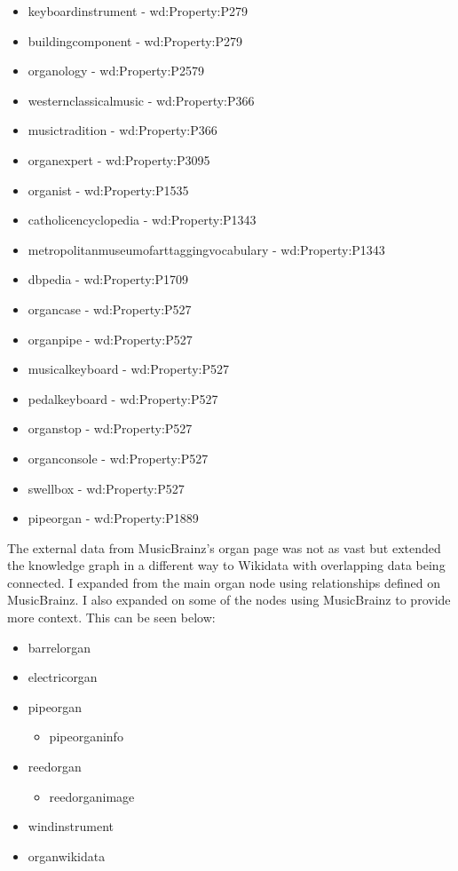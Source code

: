\begin{itemize}
    \itemsep0em 
    \item keyboardinstrument - wd:Property:P279
    \item buildingcomponent - wd:Property:P279
    \item organology - wd:Property:P2579 
    \item westernclassicalmusic - wd:Property:P366
    \item musictradition - wd:Property:P366
    \item organexpert - wd:Property:P3095
    \item organist - wd:Property:P1535
    \item catholicencyclopedia - wd:Property:P1343
    \item metropolitanmuseumofarttaggingvocabulary - wd:Property:P1343
    \item dbpedia - wd:Property:P1709
    \item organcase - wd:Property:P527
    \item organpipe - wd:Property:P527
    \item musicalkeyboard - wd:Property:P527
    \item pedalkeyboard - wd:Property:P527
    \item organstop - wd:Property:P527
    \item organconsole - wd:Property:P527
    \item swellbox - wd:Property:P527
    \item pipeorgan - wd:Property:P1889
\end{itemize}

The external data from MusicBrainz's organ page \cite{organmusicbrainz} was not as vast but extended the knowledge graph in a different way to Wikidata with overlapping data being connected. I expanded from the main organ node using relationships defined on MusicBrainz.  I also expanded on some of the nodes using MusicBrainz to provide more context. This can be seen below:

\begin{itemize}
    \itemsep0em 
    \item barrelorgan
    \item electricorgan
    \item pipeorgan
    \begin{itemize}
        \itemsep0em 
        \item pipeorganinfo
    \end{itemize}
    \item reedorgan
    \begin{itemize}
        \itemsep0em 
        \item reedorganimage
    \end{itemize}
    \item windinstrument
    \item organwikidata 
\end{itemize}

